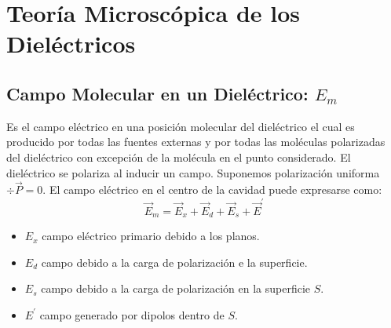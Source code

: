 \section{Teoría Microscópica de los Dieléctricos}
\subsection{Campo Molecular en un Dieléctrico: $E_m$}
Es el campo eléctrico en una posición molecular del dieléctrico el cual es producido por todas las fuentes externas y por todas las moléculas polarizadas del dieléctrico con excepción de la molécula en el punto considerado. El dieléctrico se polariza al inducir un campo. Suponemos polarización uniforma $\div{\vec{P}} = 0$. El campo eléctrico en el centro de la cavidad puede expresarse como:
\begin{equation}
	\vec{E}_m = \vec{E} _x + \vec{E}_d + \vec{E} _s + \vec{E} ^\prime
\end{equation}

\begin{itemize}
	\item $E_x$ campo eléctrico primario debido a los planos.
	\item $E_d$ campo debido a la carga de polarización e la superficie.
	\item $E_s$ campo debido a la carga de polarización en la superficie $S$.
	\item $E^\prime$ campo generado por dipolos dentro de $S$.
\end{itemize}


